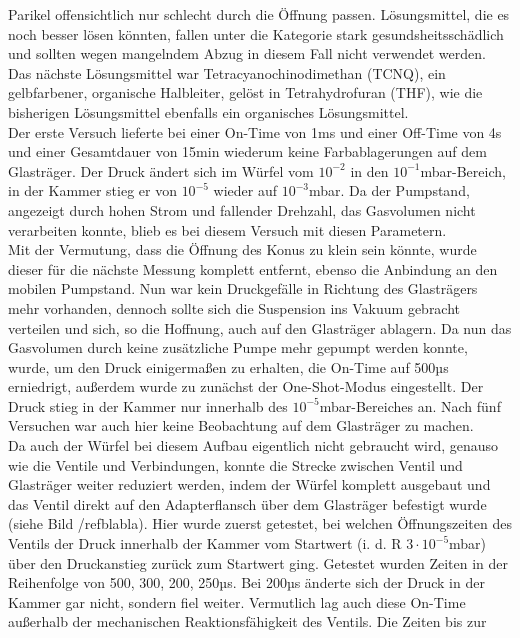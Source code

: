 Parikel offensichtlich nur schlecht durch die Öffnung passen. Lösungsmittel, die es noch besser lösen könnten,
fallen unter die Kategorie stark gesundsheitsschädlich und sollten wegen mangelndem Abzug in diesem Fall nicht
verwendet werden.\\
Das nächste Lösungsmittel war Tetracyanochinodimethan (TCNQ), ein gelbfarbener, organische
Halbleiter, gelöst in Tetrahydrofuran (THF), wie die bisherigen Lösungsmittel ebenfalls ein
organisches Lösungsmittel. \\
Der erste Versuch lieferte bei einer On-Time von 1ms und einer Off-Time von 4s und einer
Gesamtdauer von 15min wiederum keine Farbablagerungen auf dem Glasträger. Der Druck ändert sich im
Würfel vom $10^{-2}$ in den $10^{-1}$mbar-Bereich, in der Kammer stieg er von $10^{-5}$ wieder auf $10^{-3}$mbar. Da der
Pumpstand, angezeigt durch hohen Strom und fallender Drehzahl, das Gasvolumen nicht verarbeiten
konnte, blieb es bei diesem Versuch mit diesen Parametern.\\
Mit der Vermutung, dass die Öffnung des Konus zu klein sein könnte, wurde dieser für die nächste
Messung komplett entfernt, ebenso die Anbindung an den mobilen Pumpstand. Nun war kein Druckgefälle
in Richtung des Glasträgers mehr vorhanden, dennoch sollte sich die Suspension ins Vakuum gebracht
verteilen und sich, so die Hoffnung, auch auf den Glasträger ablagern. Da nun das Gasvolumen durch
keine zusätzliche Pumpe mehr gepumpt werden konnte, wurde, um den Druck einigermaßen zu erhalten,
die On-Time auf 500µs erniedrigt, außerdem wurde zu zunächst der One-Shot-Modus eingestellt. Der
Druck stieg in der Kammer nur innerhalb des $10^{-5}$mbar-Bereiches an. Nach fünf Versuchen war auch
hier keine Beobachtung auf dem Glasträger zu machen. \\
Da auch der Würfel bei diesem Aufbau eigentlich nicht gebraucht wird, genauso wie die Ventile und
Verbindungen, konnte die Strecke zwischen Ventil und Glasträger weiter reduziert werden, indem der
Würfel komplett ausgebaut und das Ventil direkt auf den Adapterflansch über dem Glasträger befestigt
wurde (siehe Bild /ref{blabla}). Hier wurde zuerst getestet, bei welchen Öffnungszeiten des Ventils
der Druck innerhalb der Kammer vom Startwert (i. d. R $3\cdot10^{-5}$mbar) über den Druckanstieg
zurück zum Startwert ging. Getestet wurden Zeiten in der Reihenfolge von 500, 300, 200, 250µs. Bei
200µs änderte sich der Druck in der Kammer gar nicht, sondern fiel weiter. Vermutlich lag auch 
diese On-Time außerhalb der mechanischen Reaktionsfähigkeit des Ventils. Die Zeiten bis zur
